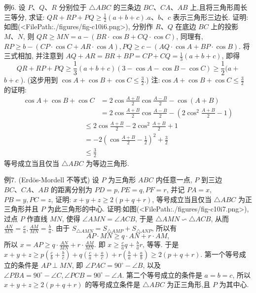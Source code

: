 例6. 设 $P 、 Q 、 R$ 分别位于 $\triangle A B C$ 的三条边 $B C 、 C A 、 A B$ 上,且将三角形周长三等分, 求证: $Q R+R P+P Q \geqslant \frac{1}{2}(a+b+c) . a 、 b 、 c$ 表示三角形三边长.
证明:如图(<FilePath:./figures/fig-c10i6.png>), 分别作 $R 、 Q$ 在底边 $B C$ 上的投影 $M 、 N$, 则 $Q R \geqslant M N=a-(B R \cdot \cos B+ C Q \cdot \cos C)$, 同理有, $R P \geqslant b-(C P \cdot \cos C+A R \cdot \cos A), P Q \geqslant c-(A Q \cdot \cos A+B P \cdot \cos B)$.
将三式相加, 并注意到 $A Q+A R=B R+B P= C P+C Q=\frac{1}{3}(a+b+c)$, 即得
$$
Q R+R P+P Q \geqslant \frac{1}{3}(a+b+c)(3-\cos A-\cos B-\cos C) \geqslant \frac{1}{2}(a+
$$
$b+c$ ). (这步用到 $\cos A+\cos B+\cos C \leqslant \frac{3}{2}$.)
注:$\cos A+\cos B+\cos C \leqslant \frac{3}{2}$ 的证明:
$$
\begin{aligned}
\cos A+\cos B+\cos C & =2 \cos \frac{A+B}{2} \cos \frac{A-B}{2}-\cos (A+B) \\
& =2 \cos \frac{A+B}{2} \cos \frac{A-B}{2}-\left(2 \cos ^2 \frac{A+B}{2}-1\right)
\end{aligned}
$$
$$
\begin{aligned}
& \leqslant 2 \cos \frac{A+B}{2}-2 \cos ^2 \frac{A+B}{2}+1 \\
& =-2\left(\cos \frac{A+B}{2}-\frac{1}{2}\right)^2+\frac{3}{2} \\
& \leqslant \frac{3}{2}
\end{aligned}
$$
等号成立当且仅当 $\triangle A B C$ 为等边三角形.



例7. (Erdös-Mordell 不等式) 设 $P$ 为三角形 $A B C$ 内任意一点, $P$ 到三边 $B C 、 C A 、 A B$ 的距离分别为 $P D=p, P E=q, P F=r$, 并记 $P A=x$, $P B=y, P C=z$, 证明: $x+y+z \geqslant 2(p+q+r)$, 等号成立当且仅当 $\triangle A B C$ 为正三角形并且 $P$ 为此三角形的中心.
证明:如图(<FilePath:./figures/fig-c10i7.png>), 过点 $P$ 作直线 $M N$, 使得 $\angle A M N=\angle A C B$, 于是 $\triangle A M N \backsim \triangle A C B$, 从而 $\frac{A N}{M N}=\frac{c}{a}, \frac{A M}{M N}=\frac{b}{a}$.
由于 $S_{\triangle A M N}=S_{\triangle A M P}+S_{\triangle A N P}$, 所以有
$$
A P \cdot M N \geqslant q \cdot A N+r \cdot A M,
$$
所以 $x=A P \geqslant q \cdot \frac{A N}{M N}+r \cdot \frac{A M}{M N}$.
即 $x \geqslant \frac{c}{a} q+\frac{b}{a} r$, 等等.
于是 $x+y+z \geqslant p\left(\frac{c}{b}+\frac{b}{c}\right)+q\left(\frac{c}{a}+\frac{a}{c}\right)+r\left(\frac{b}{a}+\frac{a}{b}\right) \geqslant 2(p+q+r)$.
第一个等号成立的条件是 $A P \perp M N$, 即 $\angle P A C=90^{\circ}-\angle B$, 以及 $\angle P B A=90^{\circ}-\angle C, \angle P C B=90^{\circ}-\angle A$.
第二个等号成立的条件是 $a=b=c$, 所以 $x+y+z \geqslant 2(p+q+r)$ 的等号成立条件是 $\triangle A B C$ 为正三角形,且 $P$ 为其中心.



